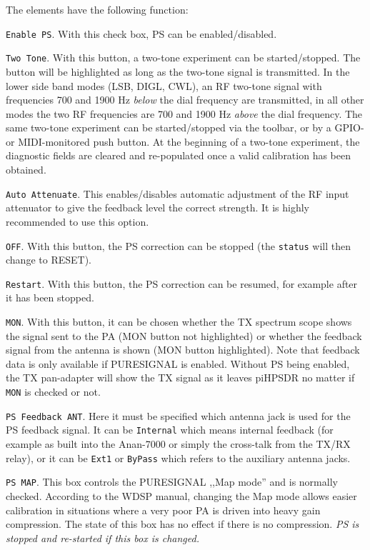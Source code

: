 \documentclass[12pt]{book}
\def\rett#1{\texttt{\color{red}#1}}
\def\pH{pi\-HPSDR\xspace}
\begin{document}
The elements have the following function:

\rett{Enable PS}. With this check box, PS can be enabled/disabled.

\rett{Two Tone}. With this button, a two-tone experiment can be started/stopped. The button
will be highlighted as long as the two-tone signal is transmitted. In the lower side band
modes (LSB, DIGL, CWL), an RF two-tone signal with frequencies 700 and 1900 Hz
\textit{below} the dial frequency are transmitted, in all other modes the two
RF frequencies are 700 and 1900 Hz \textit{above} the dial frequency. The same two-tone
experiment can be started/stopped via the toolbar, or by a GPIO- or MIDI-monitored
push button. At the beginning of a two-tone experiment, the diagnostic fields
are cleared and re-populated once a valid calibration has been obtained.

\rett{Auto Attenuate}. This enables/disables automatic adjustment of the RF input
attenuator to give the feedback level the correct strength. It is highly recommended
to use this option.

\rett{OFF}. With this button, the PS correction can be stopped (the \rett{status} will
then change to RESET).

\rett{Restart}. With this button, the PS correction can be resumed, for example after
it has been stopped.

\rett{MON}. With this button, it can be chosen whether the TX spectrum scope shows
the signal sent to the PA (MON button not highlighted) or whether the feedback signal
from the antenna is shown (MON button highlighted). Note that feedback data is only
available if PURESIGNAL is enabled. Without PS being enabled, the TX pan-adapter will
show the TX signal as it leaves \pH no matter if \rett{MON} is checked or not.

\rett{PS Feedback ANT}. Here it must be specified which antenna jack is used for the
PS feedback signal. It can be \rett{Internal} which means internal feedback
(for example as built into the Anan-7000 or  simply the cross-talk from the
TX/RX relay), or it can be \rett{Ext1} or \rett{ByPass} which refers to the
auxiliary antenna jacks.

\rett{PS MAP}. This box controls the PURESIGNAL ,,Map mode'' and is normally checked.
According to the WDSP manual, changing the Map mode allows easier calibration in
situations where a very poor PA is driven into heavy gain compression. The state
of this box has
no effect if there is no compression. \textit{PS is stopped and re-started if
this box is changed.}
\end{document}
